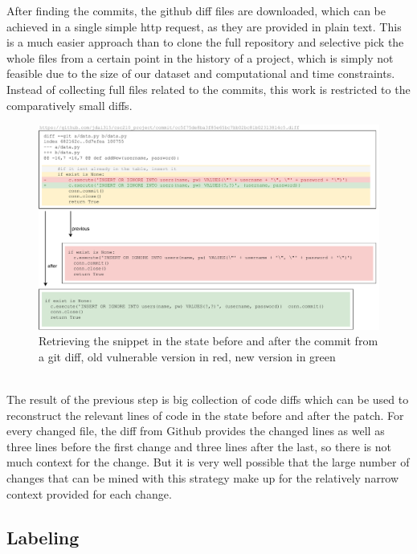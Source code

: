 \documentclass[
	a4paper,
	pagesize,
	pdftex,
	12pt,
	twoside, %
	BCOR=5mm, %
	ngerman,
	fleqn,
	final,
	]{scrartcl}
\begin{document}
After finding the commits, the github diff files are downloaded, which can be achieved in a single simple http request, as they are provided in plain text. This is a much easier approach than to clone the full repository and selective pick the whole files from a certain point in the history of a project, which is simply not feasible due to the size of our dataset and computational and time constraints. Instead of collecting full files related to the commits, this work is restricted to the comparatively small diffs.
\begin{figure}[ht]
	\centering
	\includegraphics[width=\linewidth]{img/GitCommitPreviousAfter}
	\caption{Retrieving the snippet in the state before and after the commit from a git diff, old vulnerable version in red, new version in green}
	\label{fig:gitdiff}
\end{figure}\\
The result of the previous step is big collection of code diffs which can be used to reconstruct the relevant lines of code in the state before and after the patch. For every changed file, the diff from Github provides the changed lines as well as three lines before the first change and three lines after the last, so there is not much context for the change. %
But it is very well possible that the large number of changes that can be mined with this strategy make up for the relatively narrow context provided  for each change.

\subsection{Labeling}
\end{document}
